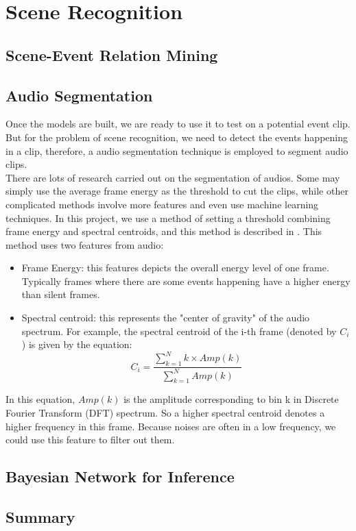 \chapter{Scene Recognition}

\section{Scene-Event Relation Mining}

\section{Audio Segmentation}
Once the models are built, we are ready to use it to test on a potential event clip. 
But for the problem of scene recognition, we need to detect the   events happening in a clip, therefore, a audio segmentation technique is employed to segment audio clips. \\ 
There are lots of research carried out on the segmentation of audios.
Some may simply use the average frame energy as the threshold to cut the clips, while other complicated methods involve more features and even use machine learning techniques. 
In this project, we use a method of setting a threshold combining frame energy and spectral centroids, and this method is described in \parencite{giannakopoulos2009method}.
This method uses two features from audio:
\begin{itemize}
\item{Frame Energy: this features depicts the overall energy level of one frame. Typically frames where there are some events happening have a higher energy than silent frames.}
\item{Spectral centroid: this represents the "center of gravity" of the audio spectrum. For example, the spectral centroid of the i-th frame (denoted by $ C_i$) is given by the equation:
\[
C_i = \frac{\sum\limits_{k=1}^Nk\times Amp(k)}{\sum\limits_{k=1}^NAmp(k)}
\]
}
\end{itemize}

In this equation, $Amp(k)$ is the amplitude corresponding to bin k in Discrete Fourier Transform (DFT) spectrum. 
So a higher spectral centroid denotes a higher frequency in this frame. Because noises are often in a low frequency, we could use this feature to filter out them. 

\section{Bayesian Network for Inference}

\section{Summary}
